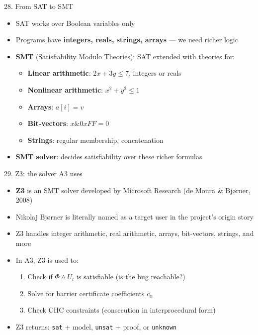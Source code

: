 \documentclass[aspectratio=169]{beamer}
\begin{document}
\begin{frame}{28. From SAT to SMT}
\begin{itemize}
  \item SAT works over Boolean variables only
  \item Programs have \textbf{integers, reals, strings, arrays} --- we need richer logic
  \item \textbf{SMT} (Satisfiability Modulo Theories): SAT extended with theories for:
    \begin{itemize}
      \item \textbf{Linear arithmetic}: \(2x + 3y \le 7\), integers or reals
      \item \textbf{Nonlinear arithmetic}: \(x^2 + y^2 \le 1\)
      \item \textbf{Arrays}: \(a[i] = v\)
      \item \textbf{Bit-vectors}: \(x \mathbin{\&} 0xFF = 0\)
      \item \textbf{Strings}: regular membership, concatenation
    \end{itemize}
  \item \textbf{SMT solver}: decides satisfiability over these richer formulas
\end{itemize}
\end{frame}

\begin{frame}{29. Z3: the solver A3 uses}
\begin{itemize}
  \item \textbf{Z3} is an SMT solver developed by Microsoft Research (de Moura \& Bj\o rner, 2008)
  \item Nikolaj Bj\o rner is literally named as a target user in the project's origin story
  \item Z3 handles integer arithmetic, real arithmetic, arrays, bit-vectors, strings, and more
  \item In A3, Z3 is used to:
    \begin{enumerate}
      \item Check if \(\Phi \wedge U_t\) is satisfiable (is the bug reachable?)
      \item Solve for barrier certificate coefficients \(c_\alpha\)
      \item Check CHC constraints (consecution in interprocedural form)
    \end{enumerate}
  \item Z3 returns: \texttt{sat} + model, \texttt{unsat} + proof, or \texttt{unknown}
\end{itemize}
\end{frame}
\end{document}

